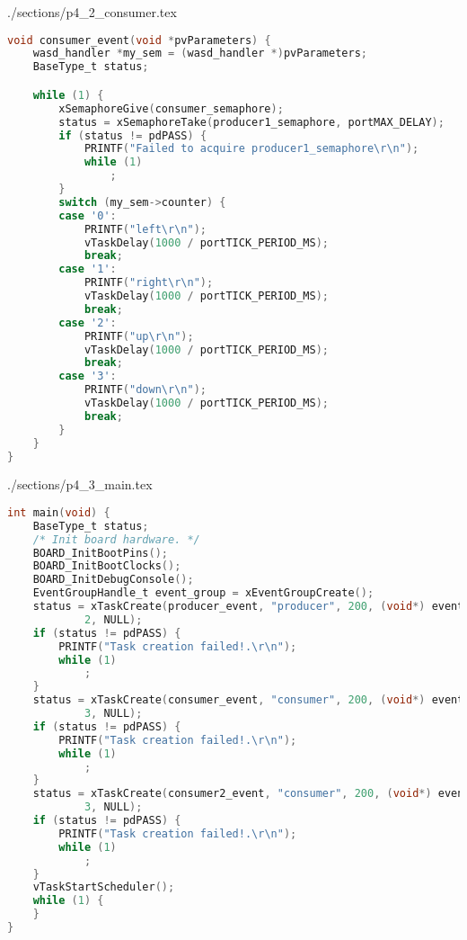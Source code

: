 \begin{filecontents}[overwrite]{./sections/p4_2_consumer.tex}
\begin{lstlisting}[language=c,caption=Problem 4.2 Consumer Task, label=list:p4_2_cons]
void consumer_event(void *pvParameters) {
    wasd_handler *my_sem = (wasd_handler *)pvParameters;
    BaseType_t status;

    while (1) {
        xSemaphoreGive(consumer_semaphore);
        status = xSemaphoreTake(producer1_semaphore, portMAX_DELAY);
        if (status != pdPASS) {
            PRINTF("Failed to acquire producer1_semaphore\r\n");
            while (1)
                ;
        }
        switch (my_sem->counter) {
        case '0':
            PRINTF("left\r\n");
            vTaskDelay(1000 / portTICK_PERIOD_MS);
            break;
        case '1':
            PRINTF("right\r\n");
            vTaskDelay(1000 / portTICK_PERIOD_MS);
            break;
        case '2':
            PRINTF("up\r\n");
            vTaskDelay(1000 / portTICK_PERIOD_MS);
            break;
        case '3':
            PRINTF("down\r\n");
            vTaskDelay(1000 / portTICK_PERIOD_MS);
            break;
        }
    }
}    
\end{lstlisting}
\end{filecontents}

\begin{filecontents}[overwrite]{./sections/p4_3_main.tex}
\begin{lstlisting}[language=c,caption=Problem 4.3 main, label=list:p4_3_main]
int main(void) {
    BaseType_t status;
    /* Init board hardware. */
    BOARD_InitBootPins();
    BOARD_InitBootClocks();
    BOARD_InitDebugConsole();
    EventGroupHandle_t event_group = xEventGroupCreate();
    status = xTaskCreate(producer_event, "producer", 200, (void*) event_group,
            2, NULL);
    if (status != pdPASS) {
        PRINTF("Task creation failed!.\r\n");
        while (1)
            ;
    }
    status = xTaskCreate(consumer_event, "consumer", 200, (void*) event_group,
            3, NULL);
    if (status != pdPASS) {
        PRINTF("Task creation failed!.\r\n");
        while (1)
            ;
    }
    status = xTaskCreate(consumer2_event, "consumer", 200, (void*) event_group,
            3, NULL);
    if (status != pdPASS) {
        PRINTF("Task creation failed!.\r\n");
        while (1)
            ;
    }
    vTaskStartScheduler();
    while (1) {
    }
}
\end{lstlisting}
\end{filecontents}

